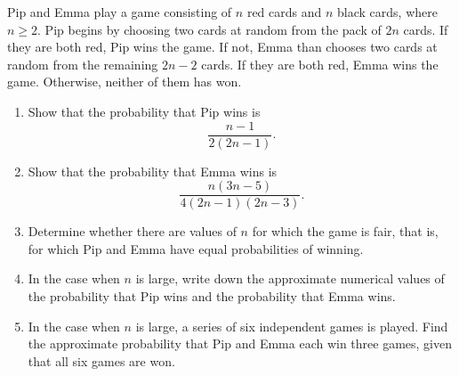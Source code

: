 \begin{problem}
    Pip and Emma play a game consisting of $n$ red cards and $n$ black cards, where $n \geq 2$. Pip begins by choosing two cards at random from the pack of $2n$ cards. If they are both red, Pip wins the game. If not, Emma than chooses two cards at random from the remaining $2n-2$ cards. If they are both red, Emma wins the game. Otherwise, neither of them has won.

    \begin{enumerate}
        \item Show that the probability that Pip wins is \[\frac{n-1}{2(2n-1)}.\]
        \item Show that the probability that Emma wins is \[\frac{n(3n-5)}{4(2n-1)(2n-3)}.\]
        \item Determine whether there are values of $n$ for which the game is fair, that is, for which Pip and Emma have equal probabilities of winning.
        \item In the case when $n$ is large, write down the approximate numerical values of the probability that Pip wins and the probability that Emma wins.
        \item In the case when $n$ is large, a series of six independent games is played. Find the approximate probability that Pip and Emma each win three games, given that all six games are won.
    \end{enumerate}
\end{problem}

